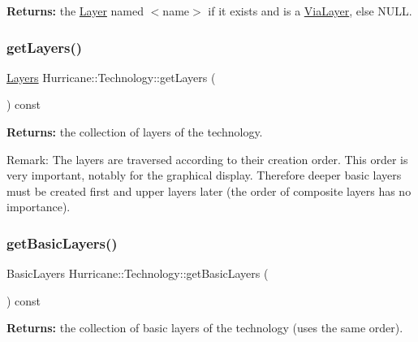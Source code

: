 {\bfseries Returns\+:} the \hyperlink{classHurricane_1_1Layer}{Layer} named {\ttfamily $<$name$>$} if it exists and is a \hyperlink{classHurricane_1_1ViaLayer}{Via\+Layer}, else {\ttfamily N\+U\+LL}. \mbox{\label{classHurricane_1_1Technology_a4e58c5ae8e3e82d7fe1b3bb939d6a633}} 
\subsubsection{\texorpdfstring{get\+Layers()}{getLayers()}}
{\footnotesize\ttfamily \hyperlink{namespaceHurricane_a7b7200a36ab7ce8a157ddbe78b625f38}{Layers} Hurricane\+::\+Technology\+::get\+Layers (\begin{DoxyParamCaption}{ }\end{DoxyParamCaption}) const\hspace{0.3cm}{\ttfamily [inline]}}

{\bfseries Returns\+:} the collection of layers of the technology.

\begin{DoxyParagraph}{Remark\+:}
The layers are traversed according to their creation order. This order is very important, notably for the graphical display. Therefore deeper basic layers must be created first and upper layers later (the order of composite layers has no importance). 
\end{DoxyParagraph}
\mbox{\label{classHurricane_1_1Technology_a7fccff9da6604fafb90408ba56184fc0}} 
\subsubsection{\texorpdfstring{get\+Basic\+Layers()}{getBasicLayers()}\hspace{0.1cm}{\footnotesize\ttfamily [1/2]}}
{\footnotesize\ttfamily Basic\+Layers Hurricane\+::\+Technology\+::get\+Basic\+Layers (\begin{DoxyParamCaption}{ }\end{DoxyParamCaption}) const}

{\bfseries Returns\+:} the collection of basic layers of the technology (uses the same order). \mbox{\label{classHurricane_1_1Technology_a997457824046ea63eba51210a8e23f85}} 
